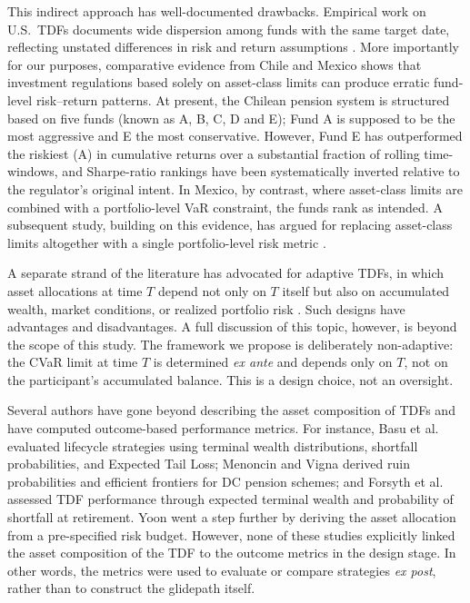 \documentclass[11pt]{article}
\begin{document}
This indirect approach has well-documented drawbacks. Empirical work 
on U.S.\ TDFs documents wide dispersion among funds with the same 
target date, reflecting unstated differences in risk and return 
assumptions \cite{elton2015,balduzzi2019}. More importantly for our 
purposes, comparative evidence from Chile and Mexico 
\cite{schlechter2019} shows that investment regulations based solely 
on asset-class limits can produce erratic fund-level risk--return 
patterns.   At present, the Chilean pension system is structured based on five  funds (known as A, B, C, D and E); Fund A is supposed to be the most aggressive and E the most conservative. However, Fund E  has outperformed 
the riskiest (A) in cumulative returns over a substantial fraction of 
rolling time-windows, and Sharpe-ratio rankings have been systematically 
inverted relative to the regulator's original intent. In Mexico, by contrast, where asset-class limits are combined with a portfolio-level VaR 
constraint, the funds rank as intended. A subsequent study, 
 building on this evidence, has argued  for replacing 
asset-class limits altogether with a single portfolio-level risk 
metric  \cite{pagnoncelli2023}. 



A separate strand of the literature has advocated for adaptive 
TDFs, in which asset allocations at time $T$ depend not only on $T$ 
itself but also on accumulated wealth, market conditions, or 
realized portfolio risk \cite{forsyth2017}. Such designs have 
advantages and disadvantages.  A full discussion of this topic, however, is beyond the scope of this study. The 
framework we propose is deliberately non-adaptive: the CVaR limit 
at time $T$ is determined  \textit{ex ante}  and depends only on $T$, not on 
the participant's accumulated balance. This is a design choice, 
not an oversight.

Several authors have gone beyond describing the asset composition of TDFs and have computed outcome-based performance metrics. For instance, Basu et al. \cite{basu2011} evaluated lifecycle strategies using terminal wealth distributions, shortfall probabilities, and Expected Tail Loss; Menoncin and Vigna \cite{menoncin2017} derived ruin probabilities and efficient frontiers for DC pension schemes; and Forsyth et al. \cite{forsyth2017b} assessed TDF performance through expected terminal wealth and probability of shortfall at retirement. Yoon \cite{yoon2010} went  a step further by deriving the asset allocation from a pre-specified risk budget. However, none of these studies explicitly linked the asset composition of the TDF to the outcome metrics in the design stage.  In other words, the metrics were  used to evaluate or compare strategies \emph{ex post}, rather than to construct the glidepath itself.
\end{document}
